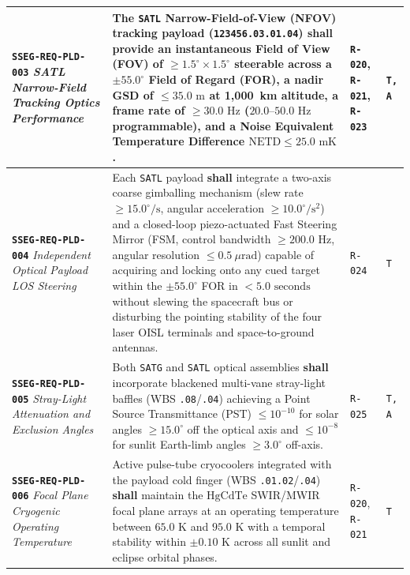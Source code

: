 \documentclass[11pt,a4paper]{article}
\providecommand{\abbr}[1]{#1}
\begin{document}
{\begin{longtable}{|>{\raggedright\arraybackslash}p{}|>{\raggedright\arraybackslash}p{}|>{\raggedright\arraybackslash}p{}|>{\raggedright\arraybackslash}p{}|}
\textbf{\texttt{SSEG-REQ-PLD-003}} \newline \emph{SATL Narrow-Field Tracking Optics Performance} & The \texttt{SATL} Narrow-Field-of-View (\abbr{NFOV}) tracking payload (\texttt{123456.03.01.04}) \textbf{shall} provide an instantaneous Field of View (\abbr{FOV}) of $\ge 1.5^\circ \times 1.5^\circ$ steerable across a $\pm 55.0^\circ$ Field of Regard (\abbr{FOR}), a nadir \abbr{GSD} of $\le 35.0\text{ m}$ at 1,000~km altitude, a frame rate of $\ge 30.0\text{ Hz}$ ($20.0\text{--}50.0\text{ Hz}$ programmable), and a Noise Equivalent Temperature Difference $\text{NETD} \le 25.0\text{ mK}$. & \texttt{R-020}, \texttt{R-021}, \texttt{R-023} & \texttt{T, A} \\ \hline
\textbf{\texttt{SSEG-REQ-PLD-004}} \newline \emph{Independent Optical Payload LOS Steering} & Each \texttt{SATL} payload \textbf{shall} integrate a two-axis coarse gimballing mechanism (slew rate $\ge 15.0^\circ/\text{s}$, angular acceleration $\ge 10.0^\circ/\text{s}^2$) and a closed-loop piezo-actuated Fast Steering Mirror (\abbr{FSM}, control bandwidth $\ge 200.0\text{ Hz}$, angular resolution $\le 0.5~\mu\mathrm{rad}$) capable of acquiring and locking onto any cued target within the $\pm 55.0^\circ$ \abbr{FOR} in $< 5.0\text{ seconds}$ without slewing the spacecraft bus or disturbing the pointing stability of the four laser \abbr{OISL} terminals and space-to-ground antennas. & \texttt{R-024} & \texttt{T} \\ \hline
\textbf{\texttt{SSEG-REQ-PLD-005}} \newline \emph{Stray-Light Attenuation and Exclusion Angles} & Both \texttt{SATG} and \texttt{SATL} optical assemblies \textbf{shall} incorporate blackened multi-vane stray-light baffles (\abbr{WBS} \texttt{.08}/\texttt{.04}) achieving a Point Source Transmittance (\abbr{PST}) $\le 10^{-10}$ for solar angles $\ge 15.0^\circ$ off the optical axis and $\le 10^{-8}$ for sunlit Earth-limb angles $\ge 3.0^\circ$ off-axis. & \texttt{R-025} & \texttt{T, A} \\ \hline
\textbf{\texttt{SSEG-REQ-PLD-006}} \newline \emph{Focal Plane Cryogenic Operating Temperature} & Active pulse-tube cryocoolers integrated with the payload cold finger (\abbr{WBS} \texttt{.01.02}/\texttt{.04}) \textbf{shall} maintain the $\mathrm{HgCdTe}$ \abbr{SWIR}/\abbr{MWIR} focal plane arrays at an operating temperature between $65.0\text{ K}$ and $95.0\text{ K}$ with a temporal stability within $\pm 0.10\text{ K}$ across all sunlit and eclipse orbital phases. & \texttt{R-020}, \newline \texttt{R-021} & \texttt{T} \\ \hline

\end{longtable}}
\end{document}
